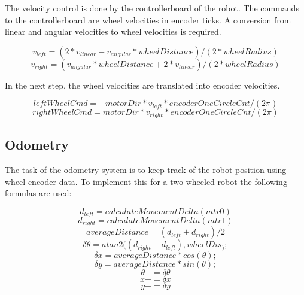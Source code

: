 \documentclass[a4paper]{article}
\begin{document}
The velocity control is done by the controllerboard of the robot. The commands to
the controllerboard are wheel velocities in encoder ticks. A conversion from linear
and angular velocities to wheel velocities is required.

\begin{equation}
        v_{left} = (2 * v_{linear} - v_{angular} * wheelDistance) / (2 * wheelRadius)
\end{equation}
\begin{equation}
        v_{right} = (v_{angular} * wheelDistance + 2 * v_{linear}) / (2 * wheelRadius)
\end{equation}

In the next step, the wheel velocities are translated into encoder velocities.

\begin{equation}
  leftWheelCmd = -motorDir * v_{left} * encoderOneCircleCnt / (2 \pi)
\end{equation}
\begin{equation}
 rightWheelCmd = motorDir * v_{right} * encoderOneCircleCnt / (2 \pi)
\end{equation}

\subsection{Odometry}
The task of the odometry system is to keep track of the robot position using wheel encoder
data. To implement this for a two wheeled robot the following formulas are used:

\begin{equation}
 d_{left} = calculateMovementDelta(mtr0)
\end{equation}
\begin{equation}
 d_{right} = calculateMovementDelta(mtr1)
\end{equation}
\begin{equation}
 averageDistance = (d_{left} + d_{right}) / 2
\end{equation}
\begin{equation}
 \delta \theta = atan2((d_{right} - d_{left}), wheelDis_);
\end{equation}
\begin{equation}
 \delta x = averageDistance * cos(\theta);
\end{equation}
\begin{equation}
 \delta y = averageDistance * sin(\theta);
\end{equation}
\begin{equation}
 \theta += \delta \theta
\end{equation}
\begin{equation}
 x += \delta x
\end{equation}
\begin{equation}
 y += \delta y
\end{equation}
\end{document}
